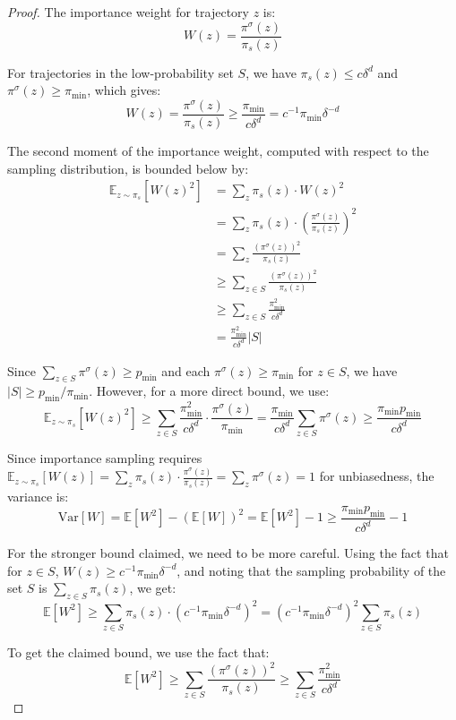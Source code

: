 \documentclass[12pt,a4paper]{article}
\begin{document}
\begin{proof}
The importance weight for trajectory $z$ is:
$$W(z) = \frac{\pi^{\sigma}(z)}{\pi_s(z)}$$

For trajectories in the low-probability set $S$, we have $\pi_s(z) \leq c\delta^{d}$ and $\pi^{\sigma}(z) \geq \pi_{\min}$, which gives:
$$W(z) = \frac{\pi^{\sigma}(z)}{\pi_s(z)} \geq \frac{\pi_{\min}}{c\delta^{d}} = c^{-1}\pi_{\min}\delta^{-d}$$

The second moment of the importance weight, computed with respect to the sampling distribution, is bounded below by:
\begin{align}
\mathbb{E}_{z \sim \pi_s}[W(z)^2] &= \sum_{z} \pi_s(z) \cdot W(z)^2 \\
&= \sum_{z} \pi_s(z) \cdot \left(\frac{\pi^{\sigma}(z)}{\pi_s(z)}\right)^2 \\
&= \sum_{z} \frac{(\pi^{\sigma}(z))^2}{\pi_s(z)} \\
&\geq \sum_{z \in S} \frac{(\pi^{\sigma}(z))^2}{\pi_s(z)} \\
&\geq \sum_{z \in S} \frac{\pi_{\min}^2}{c\delta^{d}} \\
&= \frac{\pi_{\min}^2}{c\delta^{d}} |S|
\end{align}

Since $\sum_{z \in S} \pi^{\sigma}(z) \geq p_{\min}$ and each $\pi^{\sigma}(z) \geq \pi_{\min}$ for $z \in S$, we have $|S| \geq p_{\min}/\pi_{\min}$. However, for a more direct bound, we use:
$$\mathbb{E}_{z \sim \pi_s}[W(z)^2] \geq \sum_{z \in S} \frac{\pi_{\min}^2}{c\delta^{d}} \cdot \frac{\pi^{\sigma}(z)}{\pi_{\min}} = \frac{\pi_{\min}}{c\delta^{d}} \sum_{z \in S} \pi^{\sigma}(z) \geq \frac{\pi_{\min} p_{\min}}{c\delta^{d}}$$

Since importance sampling requires $\mathbb{E}_{z \sim \pi_s}[W(z)] = \sum_z \pi_s(z) \cdot \frac{\pi^{\sigma}(z)}{\pi_s(z)} = \sum_z \pi^{\sigma}(z) = 1$ for unbiasedness, the variance is:
$$\text{Var}[W] = \mathbb{E}[W^2] - (\mathbb{E}[W])^2 = \mathbb{E}[W^2] - 1 \geq \frac{\pi_{\min} p_{\min}}{c\delta^{d}} - 1$$

For the stronger bound claimed, we need to be more careful. Using the fact that for $z \in S$, $W(z) \geq c^{-1}\pi_{\min}\delta^{-d}$, and noting that the sampling probability of the set $S$ is $\sum_{z \in S} \pi_s(z)$, we get:
$$\mathbb{E}[W^2] \geq \sum_{z \in S} \pi_s(z) \cdot (c^{-1}\pi_{\min}\delta^{-d})^2 = (c^{-1}\pi_{\min}\delta^{-d})^2 \sum_{z \in S} \pi_s(z)$$

To get the claimed bound, we use the fact that:
$$\mathbb{E}[W^2] \geq \sum_{z \in S} \frac{(\pi^{\sigma}(z))^2}{\pi_s(z)} \geq \sum_{z \in S} \frac{\pi_{\min}^2}{c\delta^{d}}$$


\end{proof}
\end{document}
